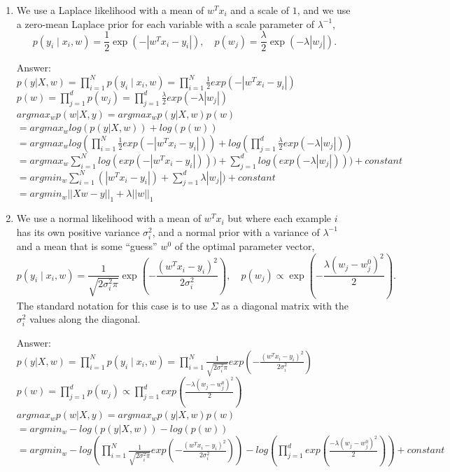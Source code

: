 \documentclass{article}
\def\ans#1{\par\gre{Answer: #1}}
\def\gre#1{{\color{gre}#1}}
\def\cond{\; | \;}
\def\enum#1{\begin{enumerate}#1\end{enumerate}}
\begin{document}
\enum{
\item  We use a Laplace likelihood with a mean of $w^Tx_i$ and a scale of $1$, and we use a zero-mean Laplace prior for each variable with a scale parameter of $\lambda^{-1}$,
\[
p(y_i \cond x_i, w) = \frac 1 2 \exp(-|w^Tx_i - y_i|), \quad  p(w_j) = \frac{\lambda}{2}\exp(-\lambda|w_j|).
\]
\ans{\\
$p(y|X,w)= \prod_{i=1}^{N}p(y_i \cond x_i,w) = \prod_{i=1}^{N}\frac{1}{2}exp(-|w^Tx_i-y_i|)$
\\
$p(w)=\prod_{j=1}^{d}p(w_j)=\prod_{j=1}^{d}\frac{\lambda}{2}exp(-\lambda|w_j|)$ \\
$argmax_w p(w|X,y)=argmax_w p(y|X,w)p(w)$\\
$=argmax_w log(p(y|X,w)) + log(p(w))$\\
$=argmax_w log(\prod_{i=1}^{N}\frac{1}{2}exp(-|w^Tx_i-y_i|)) + log(\prod_{j=1}^{d}\frac{\lambda}{2}exp(-\lambda|w_j|))$\\
$=argmax_w \sum_{i=1}^{N}log(exp(-|w^Tx_i-y_i|))) + \sum_{j=1}^{d}log(exp(-\lambda|w_j|))) + constant$ \\
$=argmin_w \sum_{i=1}^{N}(|w^Tx_i-y_i|) + \sum_{j=1}^{d}\lambda|w_j|) + constant$ \\
$=argmin_w ||Xw-y||_1 + \lambda||w||_1$ \\
}
\item We use a normal  likelihood with a mean of $w^Tx_i$ but where each example $i$ has its own  positive variance $\sigma_i^2$, and a normal prior with a variance of $\lambda^{-1}$ and a mean that is some ``guess'' $w^0$ of the optimal parameter vector,
\[
p(y_i \cond x_i,w) = \frac{1}{\sqrt{2\sigma_i^2\pi}}\exp\left(-\frac{(w^Tx_i - y_i)^2}{2\sigma_i^2}\right), \quad p(w_j) \propto \exp\left(-\frac{\lambda(w_j -  w^0_j)^2}{2}\right).
\]
The standard notation for this case is to use $\Sigma$ as a diagonal matrix with the $\sigma_i^2$ values along the diagonal.
\ans{\\
$p(y|X,w)=\prod_{i=1}^{N}p(y_i \cond x_i,w) = \prod_{i=1}^{N}\frac{1}{\sqrt{2\sigma^2_i\pi}}exp(-\frac{(w^Tx_i-y_i)^2}{2\sigma_i^2})$
\\
$p(w) = \prod_{j=1}^{d}p(w_j) \propto \prod_{j=1}^{d}exp(\frac{-\lambda(w_j-w^0_j)^2}{2})$
\\
$argmax_w p(w|X,y)=argmax_w p(y|X,w)p(w)$
\\
$=argmin_w -log(p(y|X,w)) - log(p(w))$
\\
$=argmin_w -log(\prod_{i=1}^{N}\frac{1}{\sqrt{2\sigma^2_i\pi}}exp(-\frac{(w^Tx_i-y_i)^2}{2\sigma_i^2})) - log(\prod_{j=1}^{d}exp(\frac{-\lambda(w_j-w^0_j)^2}{2})) + constant$
}}
\end{document}
